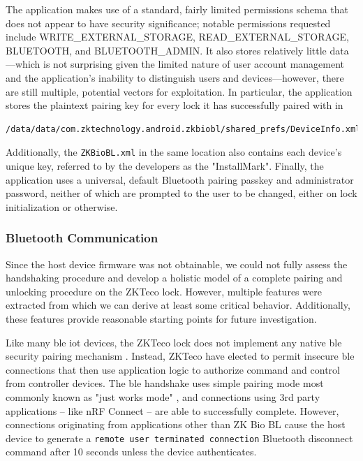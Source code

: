 \documentclass[conference]{IEEEtran}
\begin{document}
\bigskip

The application makes use of a standard, fairly limited permissions schema that does not appear to have security significance; notable permissions requested include WRITE\_EXTERNAL\_STORAGE, READ\_EXTERNAL\_STORAGE, BLUETOOTH, and BLUETOOTH\_ADMIN.  It also stores relatively little data---which is not surprising given the limited nature of user account management and the application's inability to distinguish users and devices---however, there are still multiple, potential vectors for exploitation.  In particular, the application stores the plaintext pairing key for every lock it has successfully paired with in 

\begin{lstlisting}[caption=information storage location, captionpos=b]
/data/data/com.zktechnology.android.zkbiobl/shared_prefs/DeviceInfo.xml
\end{lstlisting}

Additionally, the \verb|ZKBioBL.xml| in the same location also contains each device's unique key, referred to by the developers as the "InstallMark".  Finally, the application uses a universal, default Bluetooth pairing passkey and administrator password, neither of which are prompted to the user to be changed, either on lock initialization or otherwise.

\bigskip
\subsubsection{Bluetooth Communication}

Since the host device firmware was not obtainable, we could not fully assess the handshaking procedure and develop a holistic model of a complete pairing and unlocking procedure on the ZKTeco lock.  However, multiple features were extracted from which we can derive at least some critical behavior.  Additionally, these features provide reasonable starting points for future investigation.

\bigskip

Like many \gls{ble} \gls{iot} devices, the ZKTeco lock does not implement any native \gls{ble} security pairing mechanism \cite{Newman2019}.  Instead, ZKTeco have elected to permit insecure \gls{ble} connections that then use application logic to authorize command and control from controller devices.  The \gls{ble} handshake uses simple pairing mode most commonly known as "just works mode"  \cite{BluetoothSIG2019}, and connections using 3rd party applications -- like nRF Connect -- are able to successfully complete.  However, connections originating from applications other than ZK Bio BL cause the host device to generate a \verb|remote user terminated connection| Bluetooth disconnect command after 10 seconds unless the device authenticates.
\end{document}
